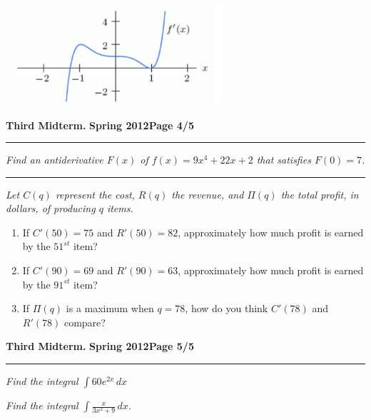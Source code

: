 \documentclass[12pt]{article}
\begin{document}
\includegraphics[width=8cm]{derivative.pdf}
\begin{flushright}
\end{flushright}
\newpage

\hfill{\large\bf Third Midterm.}\hfill{\large\bf
  Spring 2012}\hfill{\large\bf Page 4/5}\hrule

\bigskip
{\problem[10 pts] \em Find an antiderivative $F(x)$ of
  $f(x)=9x^4+22x+2$ that satisfies $F(0)=7$.}
\vspace{6cm}
\begin{flushright}
\end{flushright}
\hrule
{\problem[10 pts] \em Let $C(q)$ represent the cost, $R(q)$ the
  revenue, and $\Pi(q)$ the total profit, in dollars, of producing $q$
items.}
\begin{enumerate}
\item If $C'(50)=75$ and $R'(50)=82$, approximately how much profit is
  earned by the $51^{st}$ item?
\vspace{3cm}
\item If $C'(90)=69$ and $R'(90)=63$, approximately how much profit is
  earned by the $91^{st}$ item?
\vspace{3cm}
\item If $\Pi(q)$ is a maximum when $q=78$, how do you think $C'(78)$
  and $R'(78)$ compare?
\end{enumerate}
\newpage

\hfill{\large\bf Third Midterm.}\hfill{\large\bf
  Spring 2012}\hfill{\large\bf Page 5/5}\hrule

\bigskip
{\problem[10 pts] \em Find the integral $\displaystyle{\int 60e^{2x}\,
    dx}$} 
\vspace{8cm}
\begin{flushright}
\end{flushright}
{\problem[10 pts] \em Find the integral $\displaystyle{\int
   \frac{x}{3x^2+9}\, dx}$.}
\vspace{8cm}
\begin{flushright}
\end{flushright}
\end{document}
